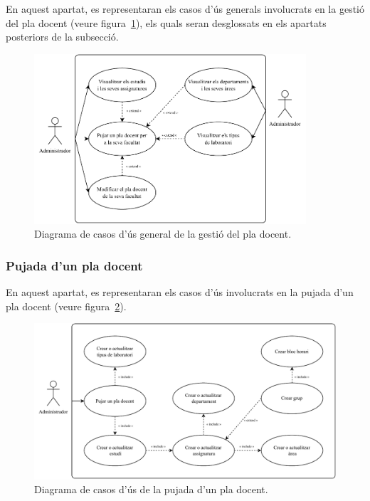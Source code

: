 \documentclass[a4paper,12pt]{ThesisStyle}
\begin{document}
En aquest apartat, es representaran els casos d'ús generals involucrats en la gestió del pla docent (veure figura~\ref{img:casos_us_pla_general}), els quals seran desglossats en els apartats posteriors de la subsecció.

\begin{figure}[H]
  \centering
  \includegraphics[width=0.9\textwidth]{assets/use_cases/pla_docent/general.pdf}
  \caption{\label{img:casos_us_pla_general}Diagrama de casos d'ús general de la gestió del pla docent.}
\end{figure}

\subsubsection{Pujada d'un pla docent}

En aquest apartat, es representaran els casos d'ús involucrats en la pujada d'un pla docent (veure figura~\ref{img:casos_us_pla_pujada}).

\begin{figure}[H]
  \centering
  \includegraphics[width=\textwidth]{assets/use_cases/pla_docent/pujada.pdf}
  \caption{\label{img:casos_us_pla_pujada}Diagrama de casos d'ús de la pujada d'un pla docent.}
\end{figure}
\end{document}

